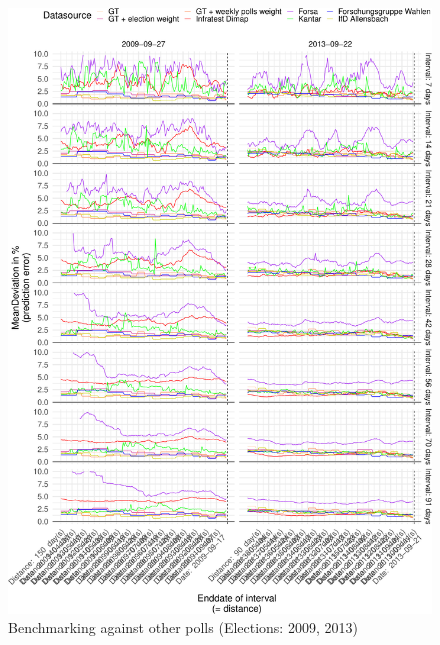 \documentclass[
  letterpaper,
  DIV=11,
  numbers=noendperiod]{scrartcl}
\begin{document}
\begin{figure}[H]

\caption{\label{fig-A10}Benchmarking against other polls (Elections:
2009, 2013)}

{\centering \includegraphics{figures/fig-A10-1.pdf}

}

\end{figure}
\end{document}
